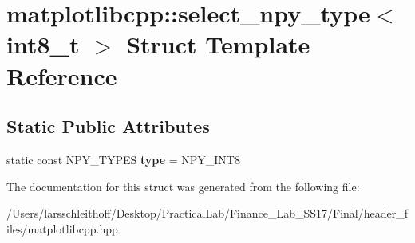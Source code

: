 \hypertarget{structmatplotlibcpp_1_1select__npy__type_3_01int8__t_01_4}{}\section{matplotlibcpp\+:\+:select\+\_\+npy\+\_\+type$<$ int8\+\_\+t $>$ Struct Template Reference}
\label{structmatplotlibcpp_1_1select__npy__type_3_01int8__t_01_4}
\subsection*{Static Public Attributes}
\begin{DoxyCompactItemize}
\item 
\mbox{\label{structmatplotlibcpp_1_1select__npy__type_3_01int8__t_01_4_a74836a19458ed32ca8948a4337364eae}} 
static const N\+P\+Y\+\_\+\+T\+Y\+P\+ES {\bfseries type} = N\+P\+Y\+\_\+\+I\+N\+T8
\end{DoxyCompactItemize}


The documentation for this struct was generated from the following file\+:\begin{DoxyCompactItemize}
\item 
/\+Users/larsschleithoff/\+Desktop/\+Practical\+Lab/\+Finance\+\_\+\+Lab\+\_\+\+S\+S17/\+Final/header\+\_\+files/matplotlibcpp.\+hpp\end{DoxyCompactItemize}
